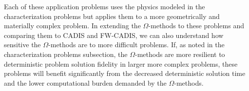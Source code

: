 Each of these application problems uses the physics modeled in the
characterization problems but applies them to a more geometrically and
materially complex problem. In extending the
$\Omega$-methods to these problems and comparing them to CADIS and FW-CADIS, we
can also understand how sensitive the $\Omega$-methods are to more difficult
problems. If, as noted in the characterization problems subsection, the
$\Omega$-methods are more resilient to deterministic problem solution fidelity
in larger more complex problems,
these problems will benefit significantly from the decreased deterministic
solution time and the lower computational burden demanded by the
$\Omega$-methods.
